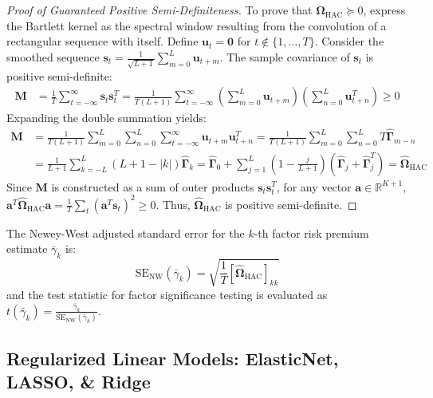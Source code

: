 \begin{proof}[Proof of Guaranteed Positive Semi-Definiteness]
To prove that $\widehat{\mathbf{\Omega}}_{\text{HAC}} \succeq 0$, express the Bartlett kernel as the spectral window resulting from the convolution of a rectangular sequence with itself. Define $\mathbf{u}_t = \mathbf{0}$ for $t \notin \{1, \dots, T\}$. Consider the smoothed sequence $\mathbf{s}_t = \frac{1}{\sqrt{L+1}} \sum_{m=0}^L \mathbf{u}_{t+m}$. The sample covariance of $\mathbf{s}_t$ is positive semi-definite:
\begin{align}
\mathbf{M} &= \frac{1}{T} \sum_{t=-\infty}^{\infty} \mathbf{s}_t \mathbf{s}_t^T = \frac{1}{T(L+1)} \sum_{t=-\infty}^{\infty} \left( \sum_{m=0}^L \mathbf{u}_{t+m} \right) \left( \sum_{n=0}^L \mathbf{u}_{t+n}^T \right) \ge 0
\end{align}
Expanding the double summation yields:
\begin{align}
\mathbf{M} &= \frac{1}{T(L+1)} \sum_{m=0}^L \sum_{n=0}^L \sum_{t=-\infty}^{\infty} \mathbf{u}_{t+m} \mathbf{u}_{t+n}^T = \frac{1}{T(L+1)} \sum_{m=0}^L \sum_{n=0}^L T \hat{\mathbf{\Gamma}}_{m-n} \\
&= \frac{1}{L+1} \sum_{k=-L}^L (L + 1 - |k|) \hat{\mathbf{\Gamma}}_k = \hat{\mathbf{\Gamma}}_0 + \sum_{j=1}^L \left( 1 - \frac{j}{L+1} \right) \left( \hat{\mathbf{\Gamma}}_j + \hat{\mathbf{\Gamma}}_j^T \right) = \widehat{\mathbf{\Omega}}_{\text{HAC}}
\end{align}
Since $\mathbf{M}$ is constructed as a sum of outer products $\mathbf{s}_t \mathbf{s}_t^T$, for any vector $\mathbf{a} \in \mathbb{R}^{K+1}$, $\mathbf{a}^T \widehat{\mathbf{\Omega}}_{\text{HAC}} \mathbf{a} = \frac{1}{T} \sum_t (\mathbf{a}^T \mathbf{s}_t)^2 \ge 0$. Thus, $\widehat{\mathbf{\Omega}}_{\text{HAC}}$ is positive semi-definite.
\end{proof}

The Newey-West adjusted standard error for the $k$-th factor risk premium estimate $\bar{\gamma}_k$ is:
\begin{equation}
\text{SE}_{\text{NW}}(\bar{\gamma}_k) = \sqrt{ \frac{1}{T} \left[ \widehat{\mathbf{\Omega}}_{\text{HAC}} \right]_{kk} }
\end{equation}
and the test statistic for factor significance testing is evaluated as $t(\bar{\gamma}_k) = \frac{\bar{\gamma}_k}{\text{SE}_{\text{NW}}(\bar{\gamma}_k)}$.

\subsection{Regularized Linear Models: ElasticNet, LASSO, \& Ridge}
\label{subsec:ch3_elasticnet_lasso_ridge}

